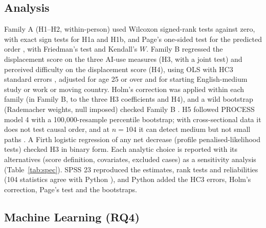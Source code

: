 \documentclass[conference]{IEEEtran}
\begin{document}
\subsection{Analysis}\label{sec:analysis}

Family A (H1--H2, within-person) used Wilcoxon signed-rank tests against zero, with exact sign tests for H1a and H1b, and Page's one-sided test for the predicted order \cite{page1963}, with Friedman's test and Kendall's $W$. Family B regressed the displacement score on the three AI-use measures (H3, with a joint test) and perceived difficulty on the displacement score (H4), using OLS with HC3 standard errors \cite{long2000}, adjusted for age 25 or over and for starting English-medium study or work or moving country. Holm's correction \cite{holm1979} was applied within each family (in Family B, to the three H3 coefficients and H4), and a wild bootstrap (Rademacher weights, null imposed) checked Family B \cite{davidson2008}. H5 followed PROCESS model 4 \cite{hayes2022} with a 100{,}000-resample percentile bootstrap; with cross-sectional data it does not test causal order, and at $n=104$ it can detect medium but not small paths \cite{fritz2007}. A Firth logistic regression \cite{firth1993} of any net decrease (profile penalised-likelihood tests) checked H3 in binary form. Each analytic choice is reported with its alternatives (score definition, covariates, excluded cases) as a sensitivity analysis (Table~\ref{tab:spec}). SPSS 23 \cite{spss23} reproduced the estimates, rank tests and reliabilities (104 statistics agree with Python \cite{seabold2010,virtanen2020}), and Python added the HC3 errors, Holm's correction, Page's test and the bootstraps.

\subsection{Machine Learning (RQ4)}
\end{document}

